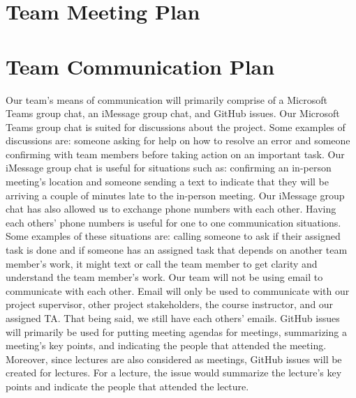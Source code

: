 \documentclass{article}
\begin{document}
\section{Team Meeting Plan}






\section{Team Communication Plan}
Our team's means of communication will primarily comprise of a Microsoft Teams group chat, an iMessage group chat, and GitHub issues. Our Microsoft Teams group chat is suited for discussions about the project.
Some examples of discussions are: someone asking for help on how to resolve an error and someone confirming with team members before 
taking action on an important task. Our iMessage group chat is useful for situations such as:
confirming an in-person meeting's location and someone sending a text to indicate that they will be arriving a couple of minutes late to the
in-person meeting. Our iMessage group chat has also allowed us to exchange phone numbers with each other.
Having each others' phone numbers is useful for one to one communication situations. Some examples of these situations are:
calling someone to ask if their assigned task is done and 
if someone has an assigned task that depends on another team member's work, it might text or call the team member to get clarity and understand the team member's work.
Our team will not be using email to communicate with each other. Email will only be used to communicate with our project supervisor, other project
stakeholders, the course instructor, and our assigned TA. That being said, we still have each others' emails. GitHub issues will primarily be used for putting meeting agendas for meetings,
summarizing a meeting's key points, and indicating the people that attended the meeting. Moreover, since
lectures are also considered as meetings, GitHub issues will be created for lectures. For a lecture, the issue would
summarize the lecture's key points and indicate the people that attended the lecture.
\end{document}
